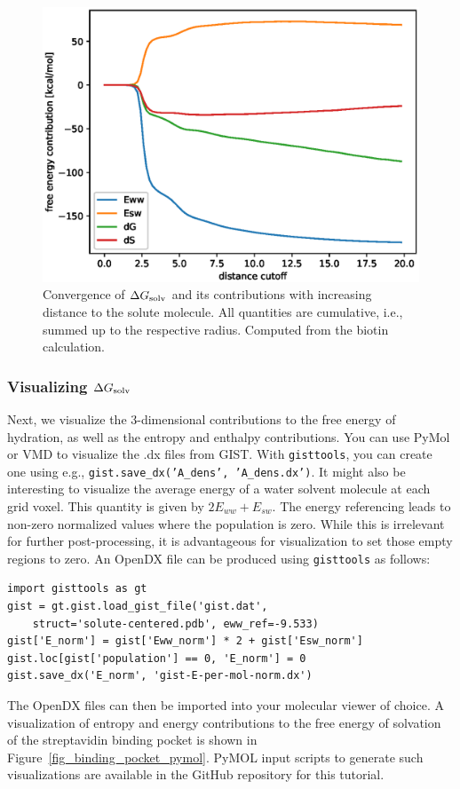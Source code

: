 \documentclass[9pt,tutorial]{livecoms}
\newcommand{\dgsolv}{\Delta G_\textup{solv}}
\newcommand{\software}{\texttt}
\newcommand\inlinecode{\texttt}
\begin{document}
\begin{figure}
	\centering
	\includegraphics[width=0.8\linewidth]{figures/A_E_S_convergence.eps}
	\caption{Convergence of $\dgsolv$ and its contributions with increasing distance to the solute molecule. All quantities are cumulative, i.e., summed up to the respective radius. Computed from the biotin calculation.}\label{fig_radial_convergence}
\end{figure}

\subsubsection{Visualizing $\dgsolv$}
Next, we visualize the 3-dimensional contributions to the free energy of hydration, as well as the entropy and enthalpy contributions.
You can use PyMol\cite{pymol} or VMD\cite{vmd} to visualize the .dx files from GIST\@.
With \software{gisttools}, you can create one using e.g., \inlinecode{gist.save\_dx('A\_dens', 'A\_dens.dx')}.
It might also be interesting to visualize the average energy of a water solvent molecule at each grid voxel.
This quantity is given by $2E_{ww} + E_{sw}$.
The energy referencing leads to non-zero normalized values where the population is zero.
While this is irrelevant for further post-processing, it is advantageous for visualization to set those empty regions to zero.
An OpenDX file can be produced using \software{gisttools} as follows:

\begin{lstlisting}[style=python]
import gisttools as gt
gist = gt.gist.load_gist_file('gist.dat',
    struct='solute-centered.pdb', eww_ref=-9.533)
gist['E_norm'] = gist['Eww_norm'] * 2 + gist['Esw_norm']
gist.loc[gist['population'] == 0, 'E_norm'] = 0
gist.save_dx('E_norm', 'gist-E-per-mol-norm.dx')
\end{lstlisting}
The OpenDX files can then be imported into your molecular viewer of choice.
A visualization of entropy and energy contributions to the free energy of solvation of the streptavidin binding pocket is shown in Figure~\ref{fig_binding_pocket_pymol}. 
PyMOL input scripts to generate such visualizations are available in the GitHub repository for this tutorial.
\end{document}
